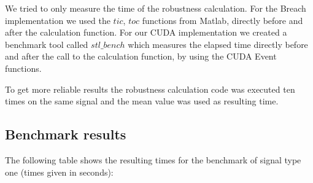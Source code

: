 \documentclass[a4paper,10pt]{article}
\begin{document}
We tried to only measure the time of the robustness calculation. For the Breach implementation we used the $tic$, $toc$ functions from Matlab, directly before and after the calculation function. For our CUDA implementation we created a benchmark tool called $stl\_bench$ which measures the elapsed time directly before and after the call to the calculation function, by using the CUDA Event functions.

To get more reliable results the robustness calculation code was executed ten times on the same signal and the mean value was used as resulting time.


\subsection{Benchmark results}

The following table shows the resulting times for the benchmark of signal type one (times given in seconds):
\end{document}
